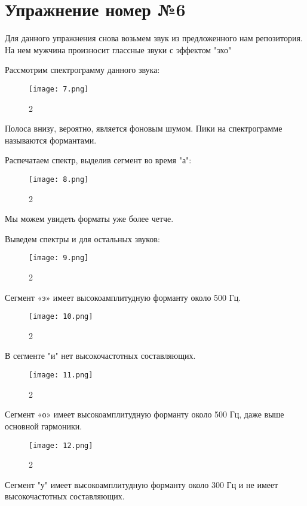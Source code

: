 ﻿\documentclass[10pt,a4paper,oneside]{article}
\begin{document}
\section{Упражнение номер №6}

Для данного упражнения снова возьмем звук из предложенного нам репозитория. На нем мужчина произносит глассные звуки с эффектом "эхо"

Рассмотрим спектрограмму данного звука: 

\begin{figure}[H]
        \centering
        \texttt{[image: 7.png]}
        \caption{2}
        \label{fig:first}
\end{figure}

Полоса внизу, вероятно, является фоновым шумом. Пики на спектрограмме называются формантами.

Распечатаем спектр, выделив сегмент во время "а":

\begin{figure}[H]
        \centering
        \texttt{[image: 8.png]}
        \caption{2}
        \label{fig:first}
\end{figure}

Мы можем увидеть форматы уже более четче.

Выведем спектры и для остальных звуков: 

\begin{figure}[H]
        \centering
        \texttt{[image: 9.png]}
        \caption{2}
        \label{fig:first}
\end{figure}

Сегмент «э» имеет высокоамплитудную форманту около 500 Гц.

\begin{figure}[H]
        \centering
        \texttt{[image: 10.png]}
        \caption{2}
        \label{fig:first}
\end{figure}

В сегменте "и" нет высокочастотных составляющих.

\begin{figure}[H]
        \centering
        \texttt{[image: 11.png]}
        \caption{2}
        \label{fig:first}
\end{figure}

Сегмент «о» имеет высокоамплитудную форманту около 500 Гц, даже выше основной гармоники.

\begin{figure}[H]
        \centering
        \texttt{[image: 12.png]}
        \caption{2}
        \label{fig:first}
\end{figure}

Сегмент "у" имеет высокоамплитудную форманту около 300 Гц и не имеет высокочастотных составляющих.
\end{document}
